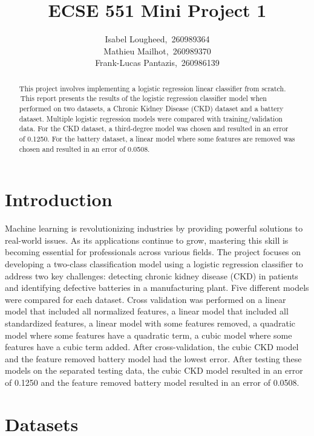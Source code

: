 \documentclass{article}
\title{ECSE 551 Mini Project 1}
\author{
  Isabel Lougheed,~260989364 \\
  \And
  Mathieu Mailhot,~260989370 \\
  \And
  Frank-Lucas Pantazis,~260986139 \\
}
\begin{document}
\maketitle

\begin{abstract}
  This project involves implementing a logistic regression linear classifier from scratch.  This report presents the results of the logistic regression classifier model when performed on two datasets, a Chronic Kidney Disease (CKD) dataset and a battery dataset.  Multiple logistic regression models were compared with training/validation data.  For the CKD dataset, a third-degree model was chosen and resulted in an error of 0.1250. For the battery dataset, a linear model where some features are removed was chosen and resulted in an error of 0.0508. 
\end{abstract}

\section{Introduction}

Machine learning is revolutionizing industries by providing powerful solutions to real-world issues. As its applications continue to grow, mastering this skill is becoming essential for professionals across various fields. The project focuses on developing a two-class classification model using a logistic regression classifier to address two key challenges: detecting chronic kidney disease (CKD) in patients and identifying defective batteries in a manufacturing plant. Five different models were compared for each dataset.  Cross validation was performed on a linear model that included all normalized features, a linear model that included all standardized features, a linear model with some features removed, a quadratic model where some features have a quadratic term, a cubic model where some features have a cubic term added.  After cross-validation, the cubic CKD model and the feature removed battery model had the lowest error.  After testing these models on the separated testing data, the cubic CKD model resulted in an error of 0.1250 and the feature removed battery model resulted in an error of 0.0508. 

\section{Datasets}
\end{document}
